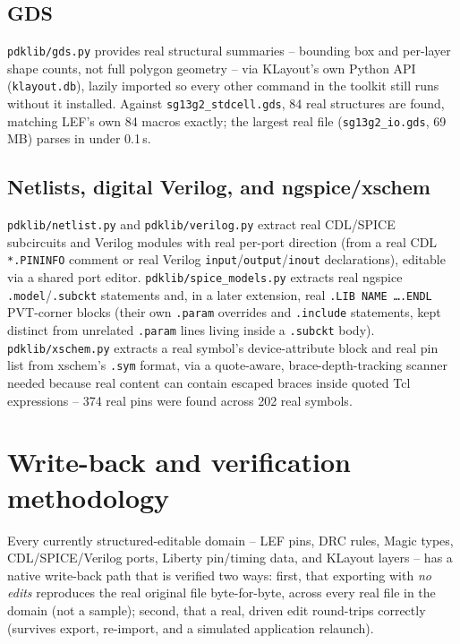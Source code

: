 \documentclass[a4paper,11pt]{article}
\begin{document}
\subsection{GDS}

\texttt{pdklib/gds.py} provides real structural summaries -- bounding
box and per-layer shape counts, not full polygon geometry -- via
KLayout's own Python API (\texttt{klayout.db}), lazily imported so
every other command in the toolkit still runs without it installed.
Against \texttt{sg13g2\_stdcell.gds}, 84 real structures are found,
matching LEF's own 84 macros exactly; the largest real file
(\texttt{sg13g2\_io.gds}, 69\,MB) parses in under 0.1\,s.

\subsection{Netlists, digital Verilog, and ngspice/xschem}

\texttt{pdklib/netlist.py} and \texttt{pdklib/verilog.py} extract real CDL/SPICE
subcircuits and Verilog modules with real per-port direction (from a
real CDL \texttt{*.PININFO} comment or real Verilog
\texttt{input}/\texttt{output}/\texttt{inout} declarations), editable
via a shared port editor. \texttt{pdklib/spice\_models.py} extracts real
ngspice \texttt{.model}/\texttt{.subckt} statements and, in a later
extension, real \texttt{.LIB NAME \ldots .ENDL} PVT-corner blocks
(their own \texttt{.param} overrides and \texttt{.include}
statements, kept distinct from unrelated \texttt{.param} lines living
inside a \texttt{.subckt} body). \texttt{pdklib/xschem.py} extracts a
real symbol's device-attribute block and real pin list from
xschem's \texttt{.sym} format, via a quote-aware, brace-depth-tracking
scanner needed because real content can contain escaped braces inside
quoted Tcl expressions -- 374 real pins were found across 202 real
symbols.

\section{Write-back and verification methodology}
\label{sec:verification}

Every currently structured-editable domain -- LEF pins, DRC rules,
Magic types, CDL/SPICE/Verilog ports, Liberty pin/timing data, and
KLayout layers -- has a native write-back path that is verified two
ways: first, that exporting with \emph{no edits} reproduces the real
original file byte-for-byte, across every real file in the domain
(not a sample); second, that a real, driven edit round-trips
correctly (survives export, re-import, and a simulated application
relaunch).
\end{document}
